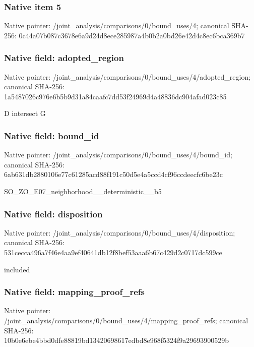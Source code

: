 \documentclass[10pt,a4paper]{article}
\begin{document}
\subsubsection{Native item 5}
Native pointer: /joint\_\allowbreak{}analysis/comparisons/0/bound\_\allowbreak{}uses/4; canonical SHA-256: 0c44a07b087c3678e6a9d24d8ece285987a4b0b2a0bd26e42d4c8ec6bca369b7

\subsubsection{Native field: adopted\_\allowbreak{}region}
Native pointer: /joint\_\allowbreak{}analysis/comparisons/0/bound\_\allowbreak{}uses/4/adopted\_\allowbreak{}region; canonical SHA-256: 1a5487026c976e6b5b9d31a84caafc7dd53f24969d4a48836dc904afad023c85

\begingroup\raggedright\sloppy D intersect G\par\endgroup

\subsubsection{Native field: bound\_\allowbreak{}id}
Native pointer: /joint\_\allowbreak{}analysis/comparisons/0/bound\_\allowbreak{}uses/4/bound\_\allowbreak{}id; canonical SHA-256: 6ab631db2880106e77c61285acd88f191c50d5e4a5ccd4cf96ccdeecfc6be23c

\begingroup\raggedright\sloppy SO\_\allowbreak{}ZO\_\allowbreak{}E07\_\allowbreak{}neighborhood\_\allowbreak{}\_\allowbreak{}deterministic\_\allowbreak{}\_\allowbreak{}b5\par\endgroup

\subsubsection{Native field: disposition}
Native pointer: /joint\_\allowbreak{}analysis/comparisons/0/bound\_\allowbreak{}uses/4/disposition; canonical SHA-256: 531cecca496a7f46e4aa9ef40641db12f8bef53aaa6b67c429d2c0717dc599ce

\begingroup\raggedright\sloppy included\par\endgroup

\subsubsection{Native field: mapping\_\allowbreak{}proof\_\allowbreak{}refs}
Native pointer: /joint\_\allowbreak{}analysis/comparisons/0/bound\_\allowbreak{}uses/4/mapping\_\allowbreak{}proof\_\allowbreak{}refs; canonical SHA-256: 10b0e6ebe4bbd0dfe88819bd13420698617edbd8e968f5324f9a29693900529b
\end{document}
